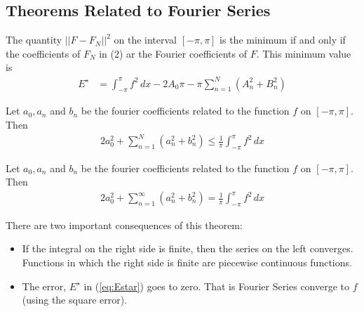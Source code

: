 \subsection{Theorems Related to Fourier Series}

\begin{theorem}
The quantity $||F-F_N||^2$ on the interval $[-\pi,\pi]$ is the minimum if and only if the coefficients of $F_N$ in (2) ar the Fourier coefficients of $F$.  This minimum value is 
% 
\begin{align} \label{eq:Estar}
E^{\star} & = \int_{-\pi}^{\pi} f^2 \, dx - 2A_0\pi - \pi \sum_{n=1}^{N} (A_n^2 + B_n^2) 
\end{align}
\end{theorem}

\begin{theorem}
Let $a_0, a_n$ and $b_n$ be the fourier coefficients related to the function $f$ on $[-\pi,\pi]$. Then
\begin{align*}
2a_0^2 + \sum_{n=1}^N (a_n^2+b_n^2) \leq \frac{1}{\pi} \int_{-\pi}^{\pi} f^2 \, dx 
\end{align*}
\end{theorem}

\begin{theorem}
Let $a_0, a_n$ and $b_n$ be the fourier coefficients related to the function $f$ on $[-\pi,\pi]$. Then
\begin{align*}
2a_0^2 + \sum_{n=1}^{\infty} (a_n^2+b_n^2) = \frac{1}{\pi} \int_{-\pi}^{\pi} f^2 \, dx 
\end{align*}

\end{theorem}

There are two important consequences of this theorem:

\begin{itemize}
\item If the integral on the right side is finite, then the series on the left converges.   Functions in which the right side is finite are piecewise continuous functions.

\item The error, $E^{\star}$ in (\ref{eq:Estar}) goes to zero.  That is Fourier Series converge to $f$ (using the square error).  
\end{itemize}

